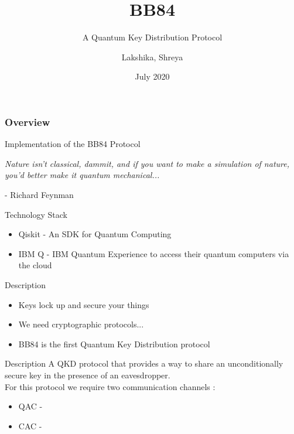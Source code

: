 \documentclass[11 pt]{beamer}
\title[BB84]{BB84}
\subtitle{A Quantum Key Distribution Protocol}
\author[Team 37]{Lakshika, Shreya}
\date{July 2020}
\begin{document}
\begin{frame}
	\titlepage
\end{frame}


\begin{frame}
	\frametitle{Overview}
	 Implementation of the BB84 Protocol
\end{frame}


\begin{frame}[standout]
    \begin{center}
        \emph{Nature isn’t classical, dammit, and if you want to make a simulation of nature, you’d better make it quantum mechanical...}
    \end{center}
    \begin{flushright}
        - Richard Feynman
    \end{flushright}
\end{frame}


\begin{frame}{Technology Stack}
	\begin{itemize}
		\item Qiskit - An SDK for Quantum Computing
		\item IBM Q - IBM Quantum Experience to access their quantum computers via the cloud
	\end{itemize}
\end{frame}

\begin{frame}{Description}
    \begin{itemize}[<+->] 
        \item Keys lock up and secure your things
        \item We need cryptographic protocols...
        \item BB84 is the first Quantum Key Distribution protocol
    \end{itemize}
\end{frame}

\begin{frame}{Description}
    A QKD protocol that provides a way to share an unconditionally secure key in the presence of an eavesdropper.\\
    For this protocol we require two communication channels : 
    \begin{itemize}[<+->]
        \item QAC - 
        \item CAC - 
    \end{itemize}
\end{frame}
\end{document}
